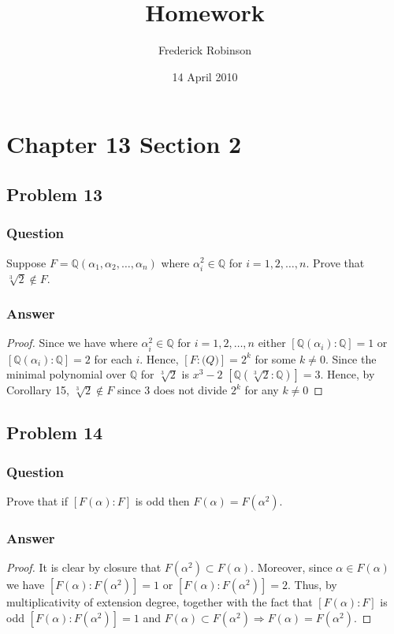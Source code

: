 \documentclass[10pt]{article}
\title{Homework}
\author{Frederick Robinson}
\date{14 April 2010}
\begin{document}

   \maketitle

\setcounter{tocdepth}{2} 

\tableofcontents

\section{Chapter 13 Section 2}
\subsection{Problem 13}
\subsubsection{Question}
Suppose $F=\mathbb{Q}(\alpha_1,\alpha_2,\dots,\alpha_n)$ where $\alpha_i^2\in \mathbb{Q}$ for $i=1,2,\dots, n$. Prove that $\sqrt[3]2\notin F$.
\subsubsection{Answer}
\begin{proof}
Since we have where $\alpha_i^2\in \mathbb{Q}$ for $i=1,2,\dots, n$ either $[\mathbb{Q}(\alpha_i): \mathbb{Q}]=1$ or  $[\mathbb{Q}(\alpha_i): \mathbb{Q}]=2$ for each $i$. Hence, $[F: \mathbb(Q)] = 2^k$ for some $k\neq 0$. Since the minimal polynomial over $\mathbb{Q}$ for $\sqrt[3]2$ is $x^3-2$ $[\mathbb{Q}(\sqrt[3]2:\mathbb{Q})]=3$. Hence, by Corollary 15, $\sqrt[3]2\notin F$ since $3$ does not divide $2^k$ for any $k \neq 0$
\end{proof}

\subsection{Problem 14}
\subsubsection{Question}
Prove that if $[F(\alpha):F]$ is odd then $F(\alpha)=F(\alpha^2)$.
\subsubsection{Answer}
\begin{proof}
It is clear by closure that $F(\alpha^2) \subset F(\alpha)$. Moreover, since $\alpha \in F(\alpha)$ we have $[F(\alpha): F(\alpha^2)]=1$ or $[F(\alpha): F(\alpha^2)]=2$. Thus, by multiplicativity of extension degree, together with the fact that $[F(\alpha):F]$ is odd  $[F(\alpha): F(\alpha^2)]=1$ and $F(\alpha) \subset F(\alpha^2) \Rightarrow F(\alpha)=F(\alpha^2)$.
\end{proof}
\end{document}

